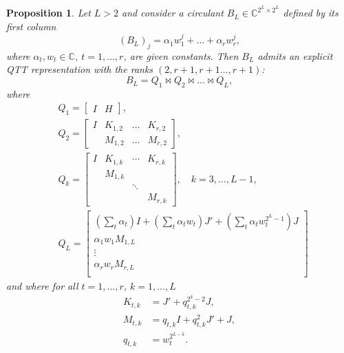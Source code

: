 \documentclass[a4paper]{article}
\newtheorem{proposition}{Proposition}[section]
\newcommand{\LL}{L}
\newcommand{\invA}{B}
\newcommand{\KK}{K}
\newcommand{\MM}{M}
\begin{document}
\begin{proposition} \label{prop:sum_z}
    Let $\LL >2$ and consider a circulant $\invA_\LL \in \mathbb{C}^{2^\LL \times 2^\LL}$ defined by its first column
    \[
        (\invA_\LL)_j = \alpha_1 w_1^j + \dots + \alpha_r w_r^j,
    \]
    where $\alpha_t,w_t\in\mathbb{C}$, $t=1,\dots,r$, are given constants.
    Then $\invA_\LL$ admits an explicit QTT representation with the ranks $(2,r+1,r+1\dots, r+1)$:
    \[
        \invA_\LL = Q_1 \Join Q_2\Join \dots \Join Q_\LL,
    \]
    where 
    \[
    \begin{split}
        &Q_1 = 
        \begin{bmatrix}
            I & H
        \end{bmatrix},
        \\
        &Q_2 = 
        \begin{bmatrix}
            I
            &
            \KK_{1,2} & \dots & \KK_{r,2} 
            \\
             &
             \MM_{1,2} & \dots & \MM_{r,2}
        \end{bmatrix},
        \\
    &Q_k = 
    \begin{bmatrix}
        I
        &
        \KK_{1,k} & \cdots & \KK_{r,k}
        \\
        & \MM_{1,k} & \\
        & & \ddots  & \\
        & & & \MM_{r,k}
    \end{bmatrix}, 
    \quad k =3,\dots,\LL-1, \\
    &Q_\LL = 
    \begin{bmatrix}
        \left(\sum_{t} \alpha_t \right) I + \left(\sum_{t} \alpha_t w_{t} \right) J' +  \left(\sum_{t} \alpha_t w_{t}^{2^{\LL}-1} \right) J \\
        \alpha_1 w_1 \MM_{1,\LL}\\
        \vdots \\
        \alpha_{r} w_{r} \MM_{r,\LL} \\
    \end{bmatrix}
    \end{split}
    \]
    and where for all $t=1,\dots,r$, $k=1,\dots, \LL$
    \begin{align*}
        \KK_{t,k} 
        &=
        J' + q_{t,k}^{2^{k}-2} J, \\
        \MM_{t,k} &= q_{t,k}I + q_{t,k}^2 J' + J, \\
        q_{t,k} &= w_t^{2^{\LL-k}}.
    \end{align*}
\end{proposition}
\end{document}
